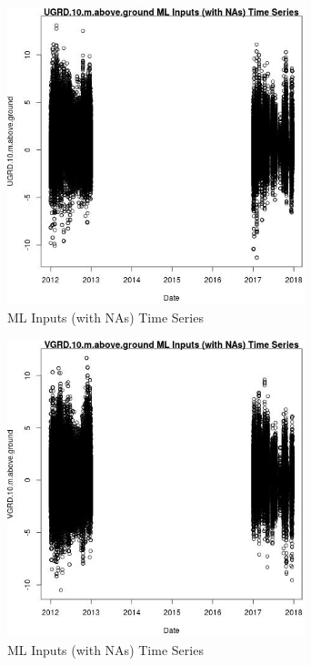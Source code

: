 \begin{figure} 
\centering  
\includegraphics[width=0.77\textwidth]{Code_Outputs/Report_ML_input_PM25_Step4_part_e_de_duplicated_aves_compiled_2019-05-14wNAs_UGRD10mabovegroundvDate.jpg} 
\caption{\label{fig:Report_ML_input_PM25_Step4_part_e_de_duplicated_aves_compiled_2019-05-14wNAsUGRD10mabovegroundvDate}ML Inputs (with NAs) Time Series} 
\end{figure} 
 

\begin{figure} 
\centering  
\includegraphics[width=0.77\textwidth]{Code_Outputs/Report_ML_input_PM25_Step4_part_e_de_duplicated_aves_compiled_2019-05-14wNAs_VGRD10mabovegroundvDate.jpg} 
\caption{\label{fig:Report_ML_input_PM25_Step4_part_e_de_duplicated_aves_compiled_2019-05-14wNAsVGRD10mabovegroundvDate}ML Inputs (with NAs) Time Series} 
\end{figure} 
 

